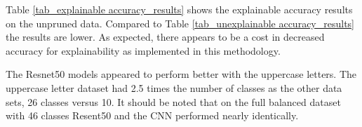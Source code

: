 \documentclass[conference]{IEEEtran}
\begin{document}
\begin{table}
    \centering
    \caption{\label{tab_unexplainable accuracy_results}Unexplainable accuracy results on various balanced EMNIST data sets with differing NN models}
\end{table}

Table \ref{tab_explainable accuracy_results} shows the explainable accuracy
results on the unpruned data. Compared to Table \ref{tab_unexplainable
accuracy_results} the results are lower.  As expected, there appears to be a
cost in decreased accuracy for explainability as implemented in this
methodology. %

The Resnet50 models appeared to perform better with the uppercase letters.  The
uppercase letter dataset had 2.5 times the number of classes as the other data
sets, 26 classes versus 10.  It should be noted that on the full balanced
dataset with 46 classes Resent50 and the CNN performed nearly identically. 
\end{document}
